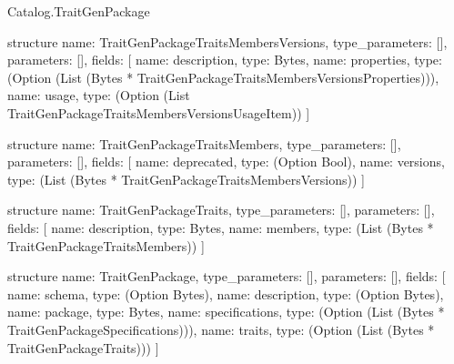 \begin{lexlean}{Catalog.TraitGenPackage}
\begin{semanticmodule}
structure{
  name: TraitGenPackageTraitsMembersVersions,
  type_parameters: [],
  parameters: [],
  fields: [
    {name: description, type: Bytes},
    {name: properties, type: (Option (List (Bytes * TraitGenPackageTraitsMembersVersionsProperties)))},
    {name: usage, type: (Option (List TraitGenPackageTraitsMembersVersionsUsageItem))}
  ]
}

structure{
  name: TraitGenPackageTraitsMembers,
  type_parameters: [],
  parameters: [],
  fields: [
    {name: deprecated, type: (Option Bool)},
    {name: versions, type: (List (Bytes * TraitGenPackageTraitsMembersVersions))}
  ]
}

structure{
  name: TraitGenPackageTraits,
  type_parameters: [],
  parameters: [],
  fields: [
    {name: description, type: Bytes},
    {name: members, type: (List (Bytes * TraitGenPackageTraitsMembers))}
  ]
}

structure{
  name: TraitGenPackage,
  type_parameters: [],
  parameters: [],
  fields: [
    {name: schema, type: (Option Bytes)},
    {name: description, type: (Option Bytes)},
    {name: package, type: Bytes},
    {name: specifications, type: (Option (List (Bytes * TraitGenPackageSpecifications)))},
    {name: traits, type: (Option (List (Bytes * TraitGenPackageTraits)))}
  ]
}
\end{semanticmodule}
\end{lexlean}
